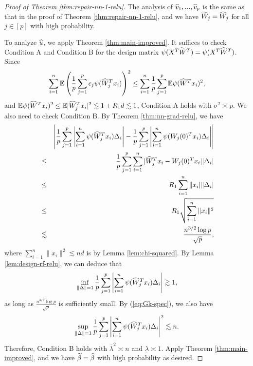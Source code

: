 \begin{proof}[Proof of Theorem \ref{thm:repair-nn-1-relu}]
The analysis of $\widehat{v}_1,...,\widehat{v}_p$ is the same as that in the proof of Theorem \ref{thm:repair-nn-1-relu}, and we have $\widetilde{W}_j=\widehat{W}_j$ for all $j\in[p]$ with high probability.

To analyze $\widehat{u}$, we apply Theorem \ref{thm:main-improved}. It suffices to check Condition A and Condition B for the design matrix $\psi(X^T\widetilde{W}^T)=\psi(X^T\widehat{W}^T)$. Since
$$\sum_{i=1}^n\mathbb{E}\left(\frac{1}{p}\sum_{j=1}^pc_j\psi(\widehat{W}_j^Tx_i)\right)^2\leq \sum_{i=1}^n\frac{1}{p}\sum_{j=1}^p\mathbb{E}\psi(\widehat{W}^Tx_i)^2,$$
and $\mathbb{E}\psi(\widehat{W}^Tx_i)^2\leq \mathbb{E}|\widehat{W}_j^Tx_i|^2\lesssim 1 + R_1d\lesssim 1$, Condition A holds with $\sigma^2\asymp p$.
We also need to check Condition B. By Theorem \ref{thm:nn-grad-relu}, we have
\begin{eqnarray*}
&& \left|\frac{1}{p}\sum_{j=1}^p\left|\sum_{i=1}^n\psi(\wh{W}_j^Tx_i)\Delta_i\right| - \frac{1}{p}\sum_{j=1}^p\left|\sum_{i=1}^n\psi(W_j(0)^Tx_i)\Delta_i\right|\right| \\
&\leq& \frac{1}{p}\sum_{j=1}^p\sum_{i=1}^n|\wh{W}_j^Tx_i-W_j(0)^Tx_i||\Delta_i| \\
&\leq& R_1\sum_{i=1}^n\|x_i\||\Delta_i| \\
&\leq& R_1\sqrt{\sum_{i=1}^n\|x_i\|^2} \\
&\lesssim& \frac{n^{3/2}\log p}{\sqrt{p}},
\end{eqnarray*}
where $\sum_{i=1}^n\|x_i\|^2\lesssim nd$ is by Lemma \ref{lem:chi-squared}. By Lemma \ref{lem:design-rf-relu}, we can deduce that
$$\inf_{\|\Delta\|=1}\frac{1}{p}\sum_{j=1}^p\left|\sum_{i=1}^n\psi(\widehat{W}_j^Tx_i)\Delta_i\right|\gtrsim 1,$$
as long as $\frac{n^{3/2}\log p}{\sqrt{p}}$ is sufficiently small. By (\ref{eq:Gk-spec}), we also have
$$\sup_{\|\Delta\|=1}\frac{1}{p}\sum_{j=1}^p\left|\sum_{i=1}^n\psi(\widehat{W}_j^Tx_i)\Delta_i\right|^2\lesssim n.$$
Therefore, Condition B holds with $\overline{\lambda}^2\asymp n$ and $\underline{\lambda}\asymp 1$. Apply Theorem \ref{thm:main-improved}, and we have $\widetilde{\beta}=\widehat{\beta}$ with high probability as desired.
\end{proof}
